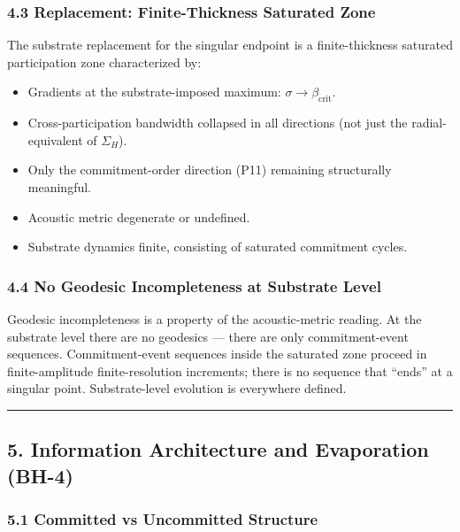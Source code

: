\documentclass[
  11pt,
  a4paper,
]{article}
\providecommand{\tightlist}{%
  \setlength{\itemsep}{0pt}\setlength{\parskip}{0pt}}
\begin{document}
\subsubsection{4.3 Replacement: Finite-Thickness Saturated
Zone}\label{replacement-finite-thickness-saturated-zone}

The substrate replacement for the singular endpoint is a
finite-thickness saturated participation zone characterized by:

\begin{itemize}
\tightlist
\item
  Gradients at the substrate-imposed maximum:
  \(\sigma \to \beta_\mathrm{crit}\).
\item
  Cross-participation bandwidth collapsed in all directions (not just
  the radial-equivalent of \(\Sigma_H\)).
\item
  Only the commitment-order direction (P11) remaining structurally
  meaningful.
\item
  Acoustic metric degenerate or undefined.
\item
  Substrate dynamics finite, consisting of saturated commitment cycles.
\end{itemize}

\subsubsection{4.4 No Geodesic Incompleteness at Substrate
Level}\label{no-geodesic-incompleteness-at-substrate-level}

Geodesic incompleteness is a property of the acoustic-metric reading. At
the substrate level there are no geodesics --- there are only
commitment-event sequences. Commitment-event sequences inside the
saturated zone proceed in finite-amplitude finite-resolution increments;
there is no sequence that ``ends'' at a singular point. Substrate-level
evolution is everywhere defined.

\begin{center}\rule{0.5\linewidth}{0.5pt}\end{center}

\subsection{5. Information Architecture and Evaporation
(BH-4)}\label{information-architecture-and-evaporation-bh-4}

\subsubsection{5.1 Committed vs Uncommitted
Structure}\label{committed-vs-uncommitted-structure}
\end{document}
